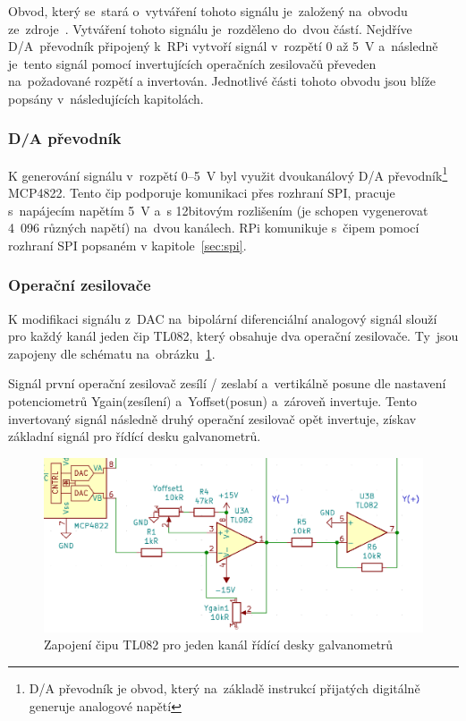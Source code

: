 Obvod, který se~stará o~vytváření tohoto signálu je~založený na~obvodu ze~zdroje~\cite{lasershow-with-real-galvos}.
Vytváření tohoto signálu je~rozděleno do~dvou částí. Nejdříve D/A~převodník připojený k~RPi vytvoří signál v~rozpětí 0 až 5~V a~následně je~tento signál pomocí invertujících operačních zesilovačů převeden na~požadované rozpětí a invertován.
Jednotlivé části tohoto obvodu jsou blíže popsány v~následujících kapitolách.

\subsubsection{D/A převodník~\cite{mcp4822-dsh}}
K generování signálu v~rozpětí 0--5~V byl využit dvoukanálový D/A převodník\footnote{D/A převodník je obvod, který na~základě instrukcí přijatých digitálně generuje analogové napětí} MCP4822.
Tento čip podporuje komunikaci přes rozhraní SPI, pracuje s~napájecím napětím 5~V a~s 12bitovým rozlišením (je schopen vygenerovat 4~096 různých napětí) na~dvou kanálech.
RPi komunikuje s~čipem pomocí rozhraní SPI popsaném v kapitole~\ref{sec:spi}.

\subsubsection{Operační zesilovače~\cite{tl082-dsh}}
K modifikaci signálu z~DAC na~bipolární diferenciální analogový signál slouží pro každý kanál jeden čip TL082, který obsahuje dva operační zesilovače. Ty~jsou zapojeny dle schématu na~obrázku~\ref{fig:ilda_amps-scheme}.

Signál první operační zesilovač zesílí / zeslabí a~vertikálně posune dle nastavení potenciometrů Ygain(zesílení) a~Yoffset(posun) a~zároveň invertuje. Tento invertovaný signál následně druhý operační zesilovač opět invertuje, získav základní signál pro řídící desku galvanometrů.

\begin{figure}[htb]
  \centering
  \includegraphics[width=1\textwidth]{img/ilda_amps.png}
  \caption{\label{fig:ilda_amps-scheme} Zapojení čipu TL082 pro jeden kanál řídící desky galvanometrů}
\end{figure}

